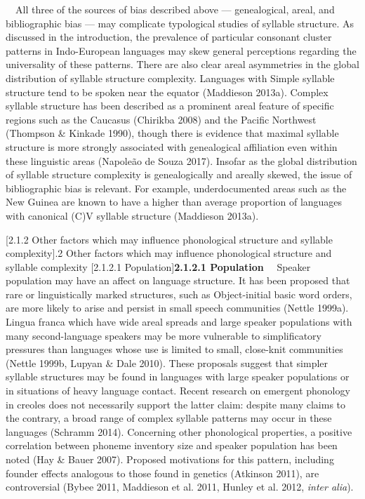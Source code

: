 \documentclass[12pt]{article}
\makeatletter
\renewcommand\section{\@startsection{section}{1}{0.0in}{0in}{0.1mm}{\normalfont\normalsize\fontsize{18pt}{21.6pt}\selectfont\rmfamily\bfseries\upshape\raggedright}}
\newenvironment{styleBody}{\renewcommand\baselinestretch{1.0}\setlength\leftskip{0in}\setlength\rightskip{0in plus 1fil}\setlength\parindent{0in}\setlength\parfillskip{0pt plus 1fil}\setlength\parskip{0in plus 1pt}\writerlistparindent\writerlistleftskip\leavevmode\normalfont\normalsize\fontsize{11pt}{13.2pt}\selectfont\mdseries\upshape\writerlistlabel\ignorespaces}{\unskip\vspace{0in plus 1pt}\par}
\newcommand\writerlistleftskip{}
\newcommand\writerlistparindent{}
\newcommand\writerlistlabel{}
\makeatother
\begin{document}
\begin{styleBody}
\ \ All three of the sources of bias described above — genealogical, areal, and bibliographic bias — may complicate typological studies of syllable structure. As discussed in the introduction, the prevalence of particular consonant cluster patterns in Indo-European languages may skew general perceptions regarding the universality of these patterns. There are also clear areal asymmetries in the global distribution of syllable structure complexity. Languages with Simple syllable structure tend to be spoken near the equator (Maddieson 2013a). Complex syllable structure has been described as a prominent areal feature of specific regions such as the Caucasus (Chirikba 2008) and the Pacific Northwest (Thompson \& Kinkade 1990), though there is evidence that maximal syllable structure is more strongly associated with genealogical affiliation even within these linguistic areas (Napoleão de Souza 2017). Insofar as the global distribution of syllable structure complexity is genealogically and areally skewed, the issue of bibliographic bias is relevant. For example, underdocumented areas such as the New Guinea are known to have a higher than average proportion of languages with canonical (C)V syllable structure (Maddieson 2013a).
\end{styleBody}

\section[2.1.2 Other factors which may influence phonological structure and syllable complexity]{.2 Other factors which may influence phonological structure and syllable complexity}
\section[2.1.2.1 Population]{\textbf{2.1.2.1 Population}}
\begin{styleBody}
\ \ Speaker population may have an affect on language structure. It has been proposed that rare or linguistically marked structures, such as Object-initial basic word orders, are more likely to arise and persist in small speech communities (Nettle 1999a). Lingua franca which have wide areal spreads and large speaker populations with many second-language speakers may be more vulnerable to simplificatory pressures than languages whose use is limited to small, close-knit communities (Nettle 1999b, Lupyan \& Dale 2010). These proposals suggest that simpler syllable structures may be found in languages with large speaker populations or in situations of heavy language contact. Recent research on emergent phonology in creoles does not necessarily support the latter claim: despite many claims to the contrary, a broad range of complex syllable patterns may occur in these languages (Schramm 2014). Concerning other phonological properties, a positive correlation between phoneme inventory size and speaker population has been noted (Hay \& Bauer 2007). Proposed motivations for this pattern, including founder effects analogous to those found in genetics (Atkinson 2011), are controversial (Bybee 2011, Maddieson et al. 2011, Hunley et al. 2012, \textit{inter alia}).
\end{styleBody}
\end{document}
